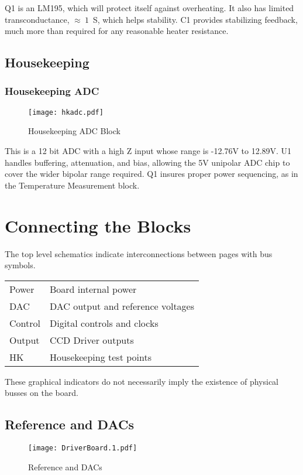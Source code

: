 Q1 is an LM195, which will protect itself against overheating. It also has limited transconductance, $\approx\ 1$\ S, which helps stability. C1 provides stabilizing feedback, much more than required for any reasonable heater resistance.

\subsection{Housekeeping}

\subsubsection{Housekeeping ADC}
   \begin{figure}
   \begin{center}
   \texttt{[image: hkadc.pdf]}
   \end{center}
   \caption{Housekeeping ADC Block}
   \end{figure}

This is a 12 bit ADC with a high Z input whose range is -12.76V to 12.89V. U1 handles buffering, attenuation, and bias, allowing the 5V unipolar ADC chip to cover the wider bipolar range required. Q1 insures proper power sequencing, as in the Temperature Measurement block.

\section{Connecting the Blocks}

The top level schematics indicate interconnections between pages with bus symbols.

\begin{tabular}{ll}
Power & Board internal power \\
DAC & DAC output and reference voltages \\
Control & Digital controls and clocks \\
Output & CCD Driver outputs \\
HK & Housekeeping test points \\
\end{tabular}

These graphical indicators do not necessarily imply the existence of physical busses on the board.

\subsection{Reference and DACs}
   \begin{figure}
   \begin{center}
   \texttt{[image: DriverBoard.1.pdf]}
   \end{center}
   \caption{Reference and DACs}
   \end{figure}
   
